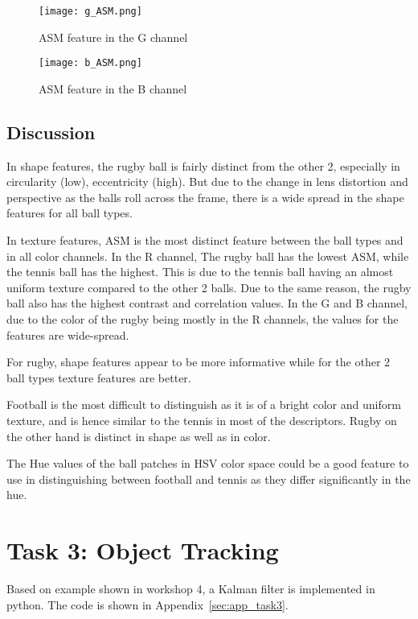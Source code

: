 \documentclass{report}
\begin{document}
\begin{figure}[ht]
    \centering
    \texttt{[image: g\_ASM.png]}
    \caption{ASM feature in the G channel}
    \label{fig:g_ASM}
\end{figure}

\begin{figure}[ht]
    \centering
    \texttt{[image: b\_ASM.png]}
    \caption{ASM feature in the B channel}
    \label{fig:b_ASM}
\end{figure}

\section{Discussion}

In shape features, the rugby ball is fairly distinct from the other 2, especially in circularity (low), eccentricity (high). But due to the change in lens distortion and perspective as the balls roll across the frame, there is a wide spread in the shape features for all ball types.

In texture features, ASM is the most distinct feature between the ball types and in all color channels. In the R channel, The rugby ball has the lowest ASM, while the tennis ball has the highest. This is due to the tennis ball having an almost uniform texture compared to the other 2 balls. Due to the same reason, the rugby ball also has the highest contrast and correlation values. In the G and B channel, due to the color of the rugby being mostly in the R channels, the values for the features are wide-spread.

For rugby, shape features appear to be more informative while for the other 2 ball types texture features are better.

Football is the most difficult to distinguish as it is of a bright color and uniform texture, and is hence similar to the tennis in most of the descriptors. Rugby on the other hand is distinct in shape as well as in color.

The Hue values of the ball patches in HSV color space could be a good feature to use in distinguishing between football and tennis as they differ significantly in the hue.

\chapter{Task 3: Object Tracking}

Based on example shown in workshop 4, a Kalman filter\cite{kalmanNewApproachLinear1960} is implemented in python. The code is shown in Appendix~\ref{sec:app_task3}.
\end{document}
